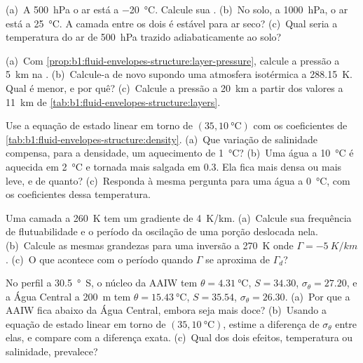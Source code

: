 \begin{exercise}[$\star\star$]\label{exo:b1:fluid-envelopes-structure:5}
(a)~A \qty{500}{hPa} o ar está a \qty{-20}{\celsius}. Calcule sua .
(b)~No solo, a \qty{1000}{hPa}, o ar está a \qty{25}{\celsius}. A camada entre os dois é estável
para ar seco? (c)~Qual seria a temperatura do ar de \qty{500}{hPa} trazido adiabaticamente ao solo?
\end{exercise}

\begin{exercise}[$\star\star$]\label{exo:b1:fluid-envelopes-structure:6}
(a)~Com \cref{prop:b1:fluid-envelopes-structure:layer-pressure}, calcule a pressão a
\qty{5}{km} na . (b)~Calcule-a de novo supondo uma atmosfera isotérmica a
\qty{288.15}{K}. Qual é menor, e por quê? (c)~Calcule a pressão a \qty{20}{km} a partir dos
valores a \qty{11}{km} de \cref{tab:b1:fluid-envelopes-structure:layers}.
\end{exercise}

\begin{exercise}[$\star\star$]\label{exo:b1:fluid-envelopes-structure:7}
Use a equação de estado linear em torno de $(35, \qty{10}{\celsius})$ com os coeficientes de
\cref{tab:b1:fluid-envelopes-structure:density}. (a)~Que variação de salinidade compensa, para a
densidade, um aquecimento de \qty{1}{\celsius}? (b)~Uma água a \qty{10}{\celsius} é aquecida em
\qty{2}{\celsius} e tornada mais salgada em \num{0.3}. Ela fica mais densa ou mais leve, e de
quanto? (c)~Responda à mesma pergunta para uma água a \qty{0}{\celsius}, com os coeficientes dessa
temperatura.
\end{exercise}

\begin{exercise}[$\star\star$]\label{exo:b1:fluid-envelopes-structure:8}
Uma camada a \qty{260}{K} tem um gradiente de \qty{4}{K/km}. (a)~Calcule sua frequência de
flutuabilidade e o período da oscilação de uma porção deslocada nela. (b)~Calcule as mesmas
grandezas para uma inversão a \qty{270}{K} onde $\Gamma = \qty{-5}{K/km}$. (c)~O que acontece com
o período quando $\Gamma$ se aproxima de $\Gamma_d$?
\end{exercise}

\begin{exercise}[$\star\star$]\label{exo:b1:fluid-envelopes-structure:9}
No perfil a \qty{30.5}{\degree S}, o núcleo da AAIW tem $\theta =
\qty{4.31}{\celsius}$, $S = 34.30$, $\sigma_\theta = 27.20$, e a Água Central a \qty{200}{m} tem
$\theta = \qty{15.43}{\celsius}$, $S = 35.54$, $\sigma_\theta = 26.30$. (a)~Por que a AAIW fica
abaixo da Água Central, embora seja mais doce? (b)~Usando a equação de estado linear em torno de
$(35, \qty{10}{\celsius})$, estime a diferença de $\sigma_\theta$ entre elas, e compare com a
diferença exata. (c)~Qual dos dois efeitos, temperatura ou salinidade, prevalece?
\end{exercise}

